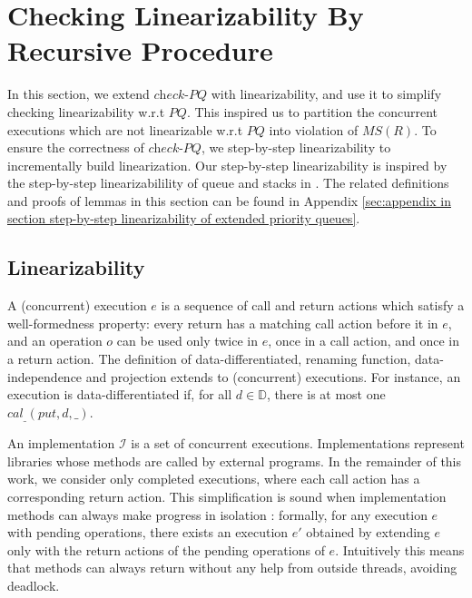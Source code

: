 \section{Checking Linearizability By Recursive Procedure}
\label{sec:checking linearizablity by recursive procedure}

In this section, we extend $\textit{check-PQ}$ with linearizability, and use it to simplify checking linearizability w.r.t $\textit{PQ}$. This inspired us to partition the concurrent executions which are not linearizable w.r.t $\textit{PQ}$ into violation of $\textit{MS}(R)$. To ensure the correctness of $\textit{check-PQ}$, we step-by-step linearizability to incrementally build linearization. Our step-by-step linearizability is inspired by the step-by-step linearizabilility of queue and stacks in \cite{Bouajjani:2015}. The related definitions and proofs of lemmas in this section can be found in Appendix \ref{sec:appendix in section step-by-step linearizability of extended priority queues}.


\subsection{Linearizability}
\label{subsec:linearizability}

A (concurrent) execution $e$ is a sequence of call and return actions which satisfy a well-formedness property: every return has a matching call action before it in $e$, and an operation $o$ can be used only twice in $e$, once in a call action, and once in a return action. The definition of data-differentiated, renaming function, data-independence and projection extends to (concurrent) executions. For instance, an execution is data-differentiated if, for all $d \in \mathbb{D}$, there is at most one $\textit{cal}_{\_}(\textit{put},d,\_)$.

An implementation $\mathcal{I}$ is a set of concurrent executions. Implementations represent libraries whose methods are called by external programs. In the remainder of this work, we consider only completed executions, where each call action has a corresponding return action. This simplification is sound when implementation methods can always make progress in isolation \cite{Henzinger:2013}: formally, for any execution $e$ with pending operations, there exists an execution $e'$ obtained by extending $e$ only with the return actions of the pending operations of $e$. Intuitively this means that methods can always return without any help from outside threads, avoiding deadlock.

